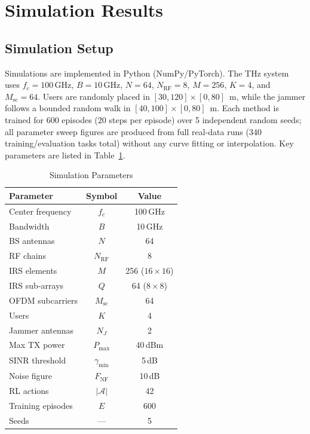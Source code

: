 \documentclass[journal,twocolumn]{IEEEtran}
\begin{document}
\section{Simulation Results}
\label{sec:results}

\subsection{Simulation Setup}

Simulations are implemented in Python (NumPy/PyTorch). The THz system uses $f_c = 100\,\text{GHz}$, $B = 10\,\text{GHz}$, $N=64$, $N_{\mathrm{RF}}=8$, $M=256$, $K=4$, and $M_{\mathrm{sc}}=64$. Users are randomly placed in $[30,120]\!\times\![0,80]$~m, while the jammer follows a bounded random walk in $[40,100]\!\times\![0,80]$~m. Each method is trained for 600 episodes (20 steps per episode) over 5 independent random seeds; all parameter sweep figures are produced from full real-data runs (340 training/evaluation tasks total) without any curve fitting or interpolation. Key parameters are listed in Table~\ref{tab:params}.

\begin{table}[t]
\centering
\caption{Simulation Parameters}
\label{tab:params}
\begin{tabular}{lcc}
\toprule
\textbf{Parameter} & \textbf{Symbol} & \textbf{Value} \\
\midrule
Center frequency & $f_c$ & 100\,GHz \\
Bandwidth & $B$ & 10\,GHz \\
BS antennas & $N$ & 64 \\
RF chains & $N_{\text{RF}}$ & 8 \\
IRS elements & $M$ & 256 ($16 \times 16$) \\
IRS sub-arrays & $Q$ & 64 ($8 \times 8$) \\
OFDM subcarriers & $M_{\text{sc}}$ & 64 \\
Users & $K$ & 4 \\
Jammer antennas & $N_J$ & 2 \\
Max TX power & $P_{\max}$ & 40\,dBm \\
SINR threshold & $\gamma_{\min}$ & 5\,dB \\
Noise figure & $F_{\text{NF}}$ & 10\,dB \\
RL actions & $|\mathcal{A}|$ & 42 \\
Training episodes & $E$ & 600 \\
Seeds & --- & 5 \\
\bottomrule
\end{tabular}
\end{table}
\end{document}

